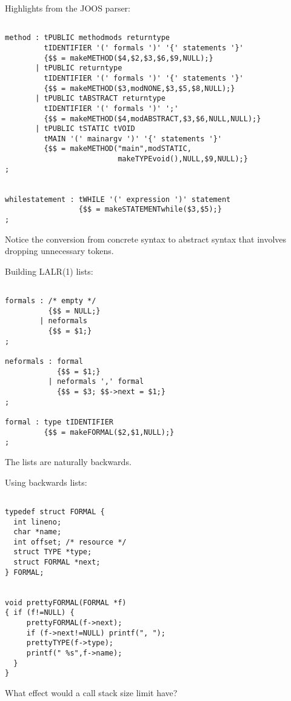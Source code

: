 \begin{slide*}
Highlights from the JOOS parser:

\begin{scriptsize}
\begin{verbatim}

method : tPUBLIC methodmods returntype 
         tIDENTIFIER '(' formals ')' '{' statements '}'
         {$$ = makeMETHOD($4,$2,$3,$6,$9,NULL);}
       | tPUBLIC returntype 
         tIDENTIFIER '(' formals ')' '{' statements '}'
         {$$ = makeMETHOD($3,modNONE,$3,$5,$8,NULL);}
       | tPUBLIC tABSTRACT returntype 
         tIDENTIFIER '(' formals ')' ';'
         {$$ = makeMETHOD($4,modABSTRACT,$3,$6,NULL,NULL);}
       | tPUBLIC tSTATIC tVOID 
         tMAIN '(' mainargv ')' '{' statements '}'
         {$$ = makeMETHOD("main",modSTATIC,
                          makeTYPEvoid(),NULL,$9,NULL);}
;


whilestatement : tWHILE '(' expression ')' statement
                 {$$ = makeSTATEMENTwhile($3,$5);}
;

\end{verbatim}
\end{scriptsize}

Notice the conversion from concrete syntax to abstract syntax that
involves dropping unnecessary tokens.
\vfil
\end{slide*}

\begin{slide*}
Building LALR(1) lists:

\begin{scriptsize}
\begin{verbatim}

formals : /* empty */ 
          {$$ = NULL;}
        | neformals
          {$$ = $1;}
;
 
neformals : formal 
            {$$ = $1;}
          | neformals ',' formal
            {$$ = $3; $$->next = $1;}
;
 
formal : type tIDENTIFIER
         {$$ = makeFORMAL($2,$1,NULL);}
;
\end{verbatim}
\end{scriptsize}

The lists are naturally backwards.
\vfil
\end{slide*}

\begin{slide*}
Using backwards lists:

\begin{scriptsize}
\begin{verbatim}

typedef struct FORMAL {
  int lineno;
  char *name;
  int offset; /* resource */
  struct TYPE *type;
  struct FORMAL *next;
} FORMAL;


void prettyFORMAL(FORMAL *f) 
{ if (f!=NULL) {
     prettyFORMAL(f->next);
     if (f->next!=NULL) printf(", ");
     prettyTYPE(f->type);
     printf(" %s",f->name);
  }
}
\end{verbatim}
\end{scriptsize}

What effect would a call stack size limit have?
\vfil
\end{slide*}
 
